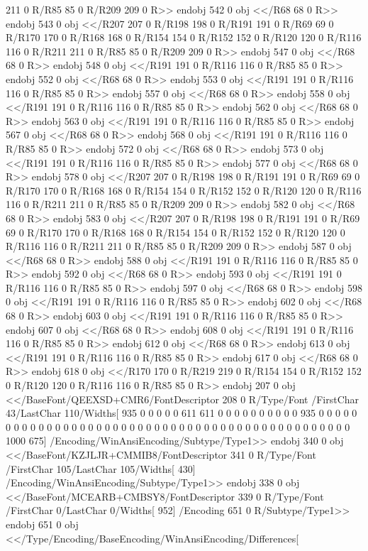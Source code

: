 {{{{{{{{{{{{{{{{{{{{{{{{{{{{211 0 R/R85
85 0 R/R209
209 0 R>>
endobj
542 0 obj
<</R68
68 0 R>>
endobj
543 0 obj
<</R207
207 0 R/R198
198 0 R/R191
191 0 R/R69
69 0 R/R170
170 0 R/R168
168 0 R/R154
154 0 R/R152
152 0 R/R120
120 0 R/R116
116 0 R/R211
211 0 R/R85
85 0 R/R209
209 0 R>>
endobj
547 0 obj
<</R68
68 0 R>>
endobj
548 0 obj
<</R191
191 0 R/R116
116 0 R/R85
85 0 R>>
endobj
552 0 obj
<</R68
68 0 R>>
endobj
553 0 obj
<</R191
191 0 R/R116
116 0 R/R85
85 0 R>>
endobj
557 0 obj
<</R68
68 0 R>>
endobj
558 0 obj
<</R191
191 0 R/R116
116 0 R/R85
85 0 R>>
endobj
562 0 obj
<</R68
68 0 R>>
endobj
563 0 obj
<</R191
191 0 R/R116
116 0 R/R85
85 0 R>>
endobj
567 0 obj
<</R68
68 0 R>>
endobj
568 0 obj
<</R191
191 0 R/R116
116 0 R/R85
85 0 R>>
endobj
572 0 obj
<</R68
68 0 R>>
endobj
573 0 obj
<</R191
191 0 R/R116
116 0 R/R85
85 0 R>>
endobj
577 0 obj
<</R68
68 0 R>>
endobj
578 0 obj
<</R207
207 0 R/R198
198 0 R/R191
191 0 R/R69
69 0 R/R170
170 0 R/R168
168 0 R/R154
154 0 R/R152
152 0 R/R120
120 0 R/R116
116 0 R/R211
211 0 R/R85
85 0 R/R209
209 0 R>>
endobj
582 0 obj
<</R68
68 0 R>>
endobj
583 0 obj
<</R207
207 0 R/R198
198 0 R/R191
191 0 R/R69
69 0 R/R170
170 0 R/R168
168 0 R/R154
154 0 R/R152
152 0 R/R120
120 0 R/R116
116 0 R/R211
211 0 R/R85
85 0 R/R209
209 0 R>>
endobj
587 0 obj
<</R68
68 0 R>>
endobj
588 0 obj
<</R191
191 0 R/R116
116 0 R/R85
85 0 R>>
endobj
592 0 obj
<</R68
68 0 R>>
endobj
593 0 obj
<</R191
191 0 R/R116
116 0 R/R85
85 0 R>>
endobj
597 0 obj
<</R68
68 0 R>>
endobj
598 0 obj
<</R191
191 0 R/R116
116 0 R/R85
85 0 R>>
endobj
602 0 obj
<</R68
68 0 R>>
endobj
603 0 obj
<</R191
191 0 R/R116
116 0 R/R85
85 0 R>>
endobj
607 0 obj
<</R68
68 0 R>>
endobj
608 0 obj
<</R191
191 0 R/R116
116 0 R/R85
85 0 R>>
endobj
612 0 obj
<</R68
68 0 R>>
endobj
613 0 obj
<</R191
191 0 R/R116
116 0 R/R85
85 0 R>>
endobj
617 0 obj
<</R68
68 0 R>>
endobj
618 0 obj
<</R170
170 0 R/R219
219 0 R/R154
154 0 R/R152
152 0 R/R120
120 0 R/R116
116 0 R/R85
85 0 R>>
endobj
207 0 obj
<</BaseFont/QEEXSD+CMR6/FontDescriptor 208 0 R/Type/Font
/FirstChar 43/LastChar 110/Widths[ 935 0 0 0 0
0 611 611 0 0 0 0 0 0 0 0 0 0 935 0 0
0 0 0 0 0 0 0 0 0 0 0 0 0 0 0 0
0 0 0 0 0 0 0 0 0 0 0 0 0 0 0 0
0 0 0 0 0 0 0 0 0 0 0 0 0 1000 675]
/Encoding/WinAnsiEncoding/Subtype/Type1>>
endobj
340 0 obj
<</BaseFont/KZJLJR+CMMIB8/FontDescriptor 341 0 R/Type/Font
/FirstChar 105/LastChar 105/Widths[ 430]
/Encoding/WinAnsiEncoding/Subtype/Type1>>
endobj
338 0 obj
<</BaseFont/MCEARB+CMBSY8/FontDescriptor 339 0 R/Type/Font
/FirstChar 0/LastChar 0/Widths[
952]
/Encoding 651 0 R/Subtype/Type1>>
endobj
651 0 obj
<</Type/Encoding/BaseEncoding/WinAnsiEncoding/Differences[
}}}}}}}}}}}}}}}}}}}}}}}}}}}}

